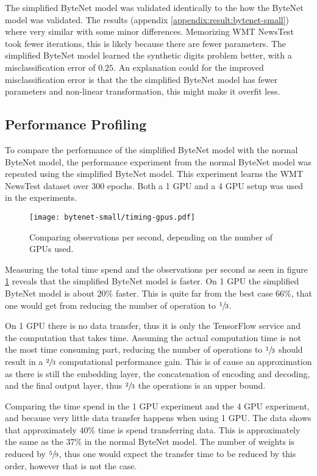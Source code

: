 The simplified ByteNet model was validated identically to the how the ByteNet model was validated. The results (appendix \ref{appendix:result:bytenet-small}) where very similar with some minor differences. Memorizing WMT NewsTest took fewer iterations, this is likely because there are fewer parameters. The simplified ByteNet model learned the synthetic digits problem better, with a misclassification error of $0.25$. An explanation could for the improved misclassification error is that the the simplified ByteNet model has fewer parameters and non-linear transformation, this might make it overfit less.

\subsection{Performance Profiling}

To compare the performance of the simplified ByteNet model with the normal ByteNet model, the performance experiment from the normal ByteNet model was repeated using the simplified ByteNet model. This experiment learns the WMT NewsTest dataset over 300 epochs. Both a 1 GPU and a 4 GPU setup was used in the experiments.

\begin{figure}[h]
    \centering
    \texttt{[image: bytenet-small/timing-gpus.pdf]}
    \caption{Comparing observations per second, depending on the number of GPUs used.}
    \label{fig:result:simple-bytenet:timing-gpus}
\end{figure}

Measuring the total time spend and the observations per second as seen in figure \ref{fig:result:simple-bytenet:timing-gpus} reveals that the simplified ByteNet model is faster. On 1 GPU the simplified ByteNet model is about $20\%$ faster. This is quite far from the best case $66\%$, that one would get from reducing the number of operation to $\sfrac{1}{3}$.

On 1 GPU there is no data transfer, thus it is only the TensorFlow service and the computation that takes time. Assuming the actual computation time is not the most time consuming part, reducing the number of operations to $\sfrac{1}{3}$ should result in a $\sfrac{2}{3}$ computational performance gain. This is of cause an approximation as there is still the embedding layer, the concatenation of encoding and decoding, and the final output layer, thus $\sfrac{2}{3}$ the operations is an upper bound.

Comparing the time spend in the 1 GPU experiment and the 4 GPU experiment, and because very little data transfer happens when using 1 GPU. The data shows that approximately $40\%$ time is spend transferring data. This is approximately the same as the $37\%$ in the normal ByteNet model. The number of weights is reduced by $\sfrac{5}{9}$, thus one would expect the transfer time to be reduced by this order, however that is not the case.

